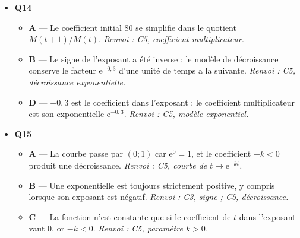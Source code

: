 \begin{itemize}
\begin{itemize}
    \item \textbf{D} — $0{,}2$ est le taux continu du modèle ; ce n'est pas la valeur de la population. \emph{Renvoi : C5, paramètres du modèle.}
  \end{itemize}
  \item \textbf{Q14}
  \begin{itemize}
    \item \textbf{A} — Le coefficient initial $80$ se simplifie dans le quotient $M(t+1)/M(t)$. \emph{Renvoi : C5, coefficient multiplicateur.}
    \item \textbf{B} — Le signe de l'exposant a été inverse : le modèle de décroissance conserve le facteur $\mathrm{e}^{-0{,}3}$ d'une unité de temps a la suivante. \emph{Renvoi : C5, décroissance exponentielle.}
    \item \textbf{D} — $-0{,}3$ est le coefficient dans l'exposant ; le coefficient multiplicateur est son exponentielle $\mathrm{e}^{-0{,}3}$. \emph{Renvoi : C5, modèle exponentiel.}
  \end{itemize}
  \item \textbf{Q15}
  \begin{itemize}
    \item \textbf{A} — La courbe passe par $(0;1)$ car $\mathrm{e}^{0}=1$, et le coefficient $-k<0$ produit une décroissance. \emph{Renvoi : C5, courbe de $t\mapsto\mathrm{e}^{-kt}$.}
    \item \textbf{B} — Une exponentielle est toujours strictement positive, y compris lorsque son exposant est négatif. \emph{Renvoi : C3, signe ; C5, décroissance.}
    \item \textbf{C} — La fonction n'est constante que si le coefficient de $t$ dans l'exposant vaut $0$, or $-k<0$. \emph{Renvoi : C5, paramètre $k>0$.}
  \end{itemize}
\end{itemize}
\fi
